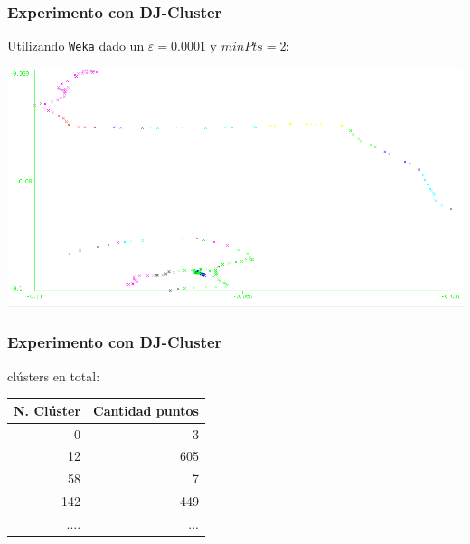 \documentclass[10pt, spanish]{beamer}
\begin{document}
\begin{frame}[fragile]
\frametitle{Experimento con DJ-Cluster}
Utilizando \texttt{Weka} dado un $\varepsilon=0.0001$ y $minPts = 2$:\\

\begin{center}
	\includegraphics[scale=.43]{djClusterSujeto1.png}
\end{center}

\end{frame}

\begin{frame}[fragile]
\frametitle{Experimento con DJ-Cluster}

 cl\'usters en total:\\

\bigskip
\begin{tabular}{|r|r|}
\hline
\rowcolor{Gray}
N. Cl\'uster & Cantidad puntos \\
\hline
0 & 3 \\ 
12 & 605\\
58 & 7\\
142 & 449\\
.... & ... \\
\hline
\end{tabular}

\end{frame}



\end{document}
